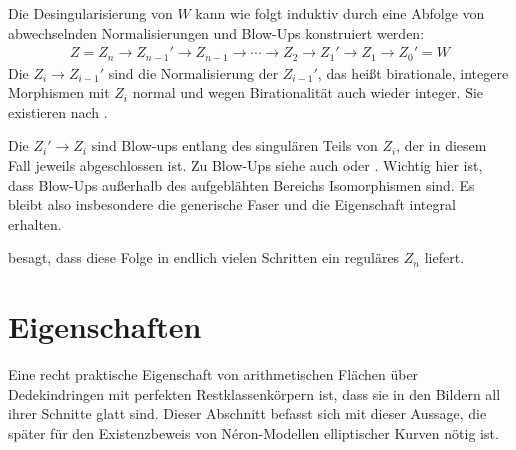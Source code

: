 \begin{Bemerkung}\label{bem:konstruktioneigmodell}
  Die Desingularisierung von $W$ kann wie folgt induktiv durch
  eine Abfolge von abwechselnden Normalisierungen und Blow-Ups
  konstruiert werden:
  \begin{gather*}
    Z=Z_{n}\to Z_{n-1}'\to Z_{n-1}\to\dotsb
    \to Z_{2}\to Z_{1}'\to Z_{1}\to Z_{0}'=W
  \end{gather*}
  Die $Z_i\to Z_{i-1}'$ sind die Normalisierung der $Z_{i-1}'$,
  das heißt birationale, integere Morphismen mit $Z_{i}$ normal
  und wegen Birationalität auch wieder integer. Sie existieren nach
  \cite[Proposition 4.1.22]{liu}.
  
  Die $Z_{i}'\to Z_{i}$ sind Blow-ups entlang des singulären Teils von
  $Z_{i}$, der in diesem Fall jeweils abgeschlossen ist.
  Zu Blow-Ups siehe auch
  \cite[Chapter 8.1]{liu} oder \cite[Chapter 13.19]{wedhorn}.
  Wichtig hier ist, dass Blow-Ups außerhalb des aufgeblähten Bereichs
  Isomorphismen sind. Es bleibt also insbesondere die generische Faser
  und die Eigenschaft integral erhalten.

  \cite[Corollary 8.3.51]{liu} besagt, dass diese Folge in endlich
  vielen Schritten ein reguläres $Z_{n}$ liefert.
\end{Bemerkung}

\section{Eigenschaften}
Eine recht praktische Eigenschaft von arithmetischen Flächen über
Dedekindringen mit perfekten Restklassenkörpern ist, dass
sie in den Bildern all ihrer Schnitte glatt sind.
Dieser Abschnitt befasst sich mit dieser Aussage, die später für
den Existenzbeweis von Néron-Modellen elliptischer Kurven nötig
ist.

